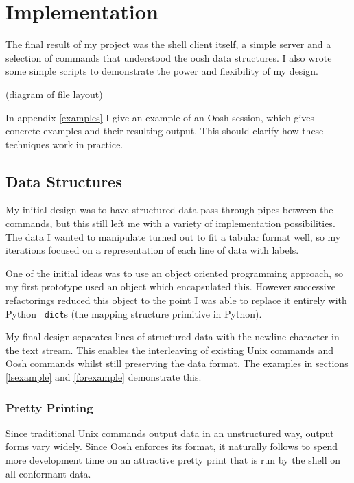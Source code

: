 \documentclass[12pt,twoside,notitlepage]{report}
\begin{document}

\cleardoublepage

\chapter{Implementation}
The final result of my project was the shell client itself, a simple server and
a selection of commands that understood the oosh data structures. I also wrote
some simple scripts to demonstrate the power and flexibility of my design.

(diagram of file layout)

In appendix \ref{examples} I give an example of an Oosh session, which
gives concrete examples and their resulting output. This should clarify how
these techniques work in practice.

\section{Data Structures}
My initial design was to have structured data pass through pipes between the
commands, but this still left me with a variety of implementation
possibilities. The data I wanted to manipulate turned out to fit a tabular
format well, so my iterations focused on a representation of each line of data
with labels. %

One of the initial ideas was to use an object oriented programming approach, so
my first prototype %
used an object which encapsulated this. However successive refactorings reduced
this object to the point I was able to replace it entirely with Python {\tt
  dict}s (the mapping structure primitive in Python).

My final design separates lines of structured data with the newline character in
the text stream. This enables the interleaving of existing Unix commands and
Oosh commands whilst still preserving the data format. The examples in sections
\ref{lsexample} and \ref{forexample} demonstrate this.

\subsection{Pretty Printing}
Since traditional Unix commands output data in an unstructured way, output forms
vary widely. Since Oosh enforces its format, it naturally follows to spend more
development time on an attractive pretty print that is run by the shell on all
conformant data.
\end{document}
